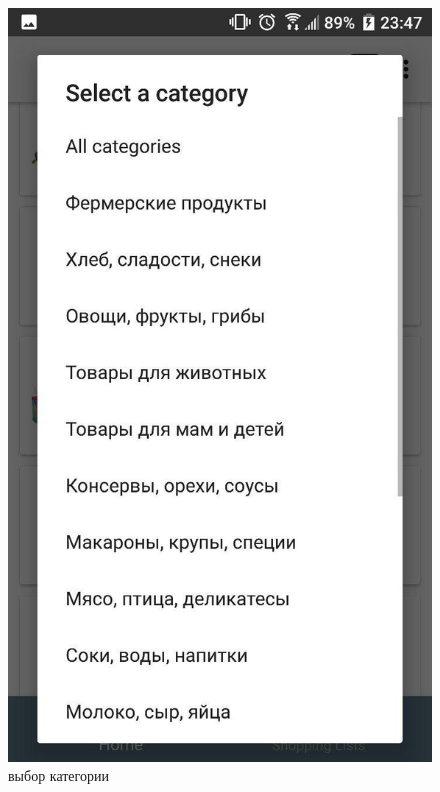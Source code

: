 \begin{figure}[h!]
    \includegraphics[height=0.38\textheight]{./screenshots/3/categories.jpg}
    \caption{\small{выбор категории}}
    \label{categs_1}
    \endminipage\hfill

\end{figure}

